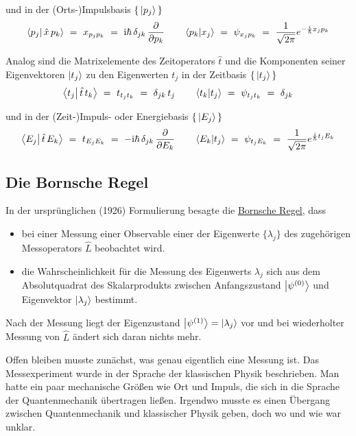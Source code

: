 \documentclass[12pt]{article}
\begin{document}
und in der (Orts-)Impulsbasis $\{\,\ket{p_j}\,\}$
\begin{equation}
\bra{p_j}\ket{\,\hat{x}\,p_k}\ =\ x_{p_j p_k}\ =\ 
\mathrm{i}\hbar\,\delta_{jk}\,\frac{\partial}{\partial p_k}
\quad\quad 
\bra{p_k}\ket{x_j}\ =\ \psi_{x_j p_k}\ =\ 
\frac{1}{\sqrt{2\pi}} e^{-\frac{i}{\hbar}x_j p_k}
\end{equation}

Analog sind die Matrixelemente des Zeitoperators $\hat{t}$ und die Komponenten seiner Eigenvektoren $\ket{t_j}$ zu den Eigenwerten $t_j$ in der Zeitbasis $\{\,\ket{t_j}\,\}$
\begin{equation}
\bra{t_j}\ket{\,\hat{t}\,t_k}\ =\ t_{t_j t_k}\ =\ \delta_{jk}\,t_j
\quad\quad 
\bra{t_k}\ket{t_j}\ =\ \psi_{t_j t_k}\ =\ \delta_{jk}
\end{equation}

und in der (Zeit-)Impuls- oder Energiebasis $\{\,\ket{E_j}\,\}$
\begin{equation}
\bra{E_j}\ket{\,\hat{t}\,E_k}\ =\ t_{E_j E_k}\ =\ 
-\mathrm{i}\hbar\,\delta_{jk}\,\frac{\partial}{\partial E_k}
\quad\quad 
\bra{E_k}\ket{t_j}\ =\ \psi_{t_j E_k}\ =\ 
\frac{1}{\sqrt{2\pi}} e^{\frac{i}{\hbar}t_j E_k}
\end{equation}

\subsection{Die Bornsche Regel}

In der ursprünglichen (1926) Formulierung besagte die \href{https://en.wikipedia.org/wiki/Born_rule}{Bornsche Regel}, dass 
\begin{itemize}
\item bei einer Messung einer Observable einer der Eigenwerte $\{\lambda_j\}$ des zugehörigen Messoperators $\hat{L}$ beobachtet wird.
\item die Wahrscheinlichkeit für die Messung des Eigenwerts $\lambda_j$ sich aus dem Absolutquadrat des Skalarprodukts zwischen Anfangszustand $\ket{\psi^{(0)}}$ und Eigenvektor $\ket{\lambda_j}$ bestimmt.
\end{itemize}
Nach der Messung liegt der Eigenzustand $\ket{\psi^{(1)}} = \ket{\lambda_j}$ vor und bei wiederholter Messung von $\hat{L}$ ändert sich daran nichts mehr. 

Offen bleiben musste zunächst, was genau eigentlich eine Messung ist. Das Messexperiment wurde in der Sprache der klassischen Physik beschrieben. Man hatte ein paar mechanische Größen wie Ort und Impuls, die sich in die Sprache der Quantenmechanik übertragen ließen. Irgendwo musste es einen Übergang zwischen Quantenmechanik und klassischer Physik geben, doch wo und wie war unklar.
\end{document}
